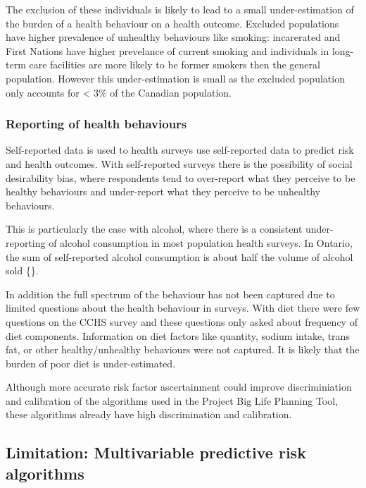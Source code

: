 \documentclass[]{book}
\begin{document}
The exclusion of these individuals is likely to lead to a small
under-estimation of the burden of a health behaviour on a health
outcome. Excluded populations have higher prevalence of unhealthy
behaviours like smoking: incarerated and First Nations have higher
prevelance of current smoking and individuals in long-term care
facilities are more likely to be former smokers then the general
population. However this under-estimation is small as the excluded
population only accounts for \textless{} 3\% of the Canadian population.

\subsubsection{Reporting of health
behaviours}\label{reporting-of-health-behaviours}

Self-reported data is used to health surveys use self-reported data to
predict risk and health outcomes. With self-reported surveys there is
the possibility of social desirability bias, where respondents tend to
over-report what they perceive to be healthy behaviours and under-report
what they perceive to be unhealthy behaviours.

This is particularly the case with alcohol, where there is a consistent
under-reporting of alcohol consumption in most population health
surveys. In Ontario, the sum of self-reported alcohol consumption is
about half the volume of alcohol sold \{\citet{ONalcohol}\}.

In addition the full spectrum of the behaviour has not been captured due
to limited questions about the health behaviour in surveys. With diet
there were few questions on the CCHS survey and these questions only
asked about frequency of diet components. Information on diet factors
like quantity, sodium intake, trans fat, or other healthy/unhealthy
behaviours were not captured. It is likely that the burden of poor diet
is under-estimated.

Although more accurate risk factor ascertainment could improve
discriminiation and calibration of the algorithms used in the Project
Big Life Planning Tool, these algorithms already have high
discrimination and calibration.

\subsection{Limitation: Multivariable predictive risk
algorithms}\label{limitation-multivariable-predictive-risk-algorithms}
\end{document}
